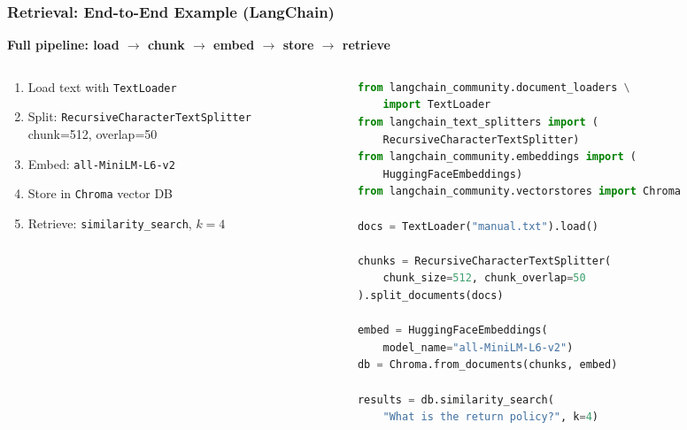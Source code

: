 \begin{frame}[fragile]\frametitle{Retrieval: End-to-End Example (LangChain)}

\textbf{Full pipeline: load $\rightarrow$ chunk $\rightarrow$ embed $\rightarrow$ store $\rightarrow$ retrieve}

\begin{columns}
  \begin{column}[T]{0.6\linewidth}
    \begin{enumerate}
      \item Load text with \texttt{TextLoader}
      \item Split: \texttt{RecursiveCharacterTextSplitter}\\
            chunk=512, overlap=50
      \item Embed: \texttt{all-MiniLM-L6-v2}
      \item Store in \texttt{Chroma} vector DB
      \item Retrieve: \texttt{similarity\_search}, $k=4$
    \end{enumerate}
  \end{column}
  \begin{column}[T]{0.4\linewidth}
\begin{lstlisting}[language=python, basicstyle=\tiny]
from langchain_community.document_loaders \
    import TextLoader
from langchain_text_splitters import (
    RecursiveCharacterTextSplitter)
from langchain_community.embeddings import (
    HuggingFaceEmbeddings)
from langchain_community.vectorstores import Chroma

docs = TextLoader("manual.txt").load()

chunks = RecursiveCharacterTextSplitter(
    chunk_size=512, chunk_overlap=50
).split_documents(docs)

embed = HuggingFaceEmbeddings(
    model_name="all-MiniLM-L6-v2")
db = Chroma.from_documents(chunks, embed)

results = db.similarity_search(
    "What is the return policy?", k=4)
\end{lstlisting}
  \end{column}
\end{columns}

\end{frame}



